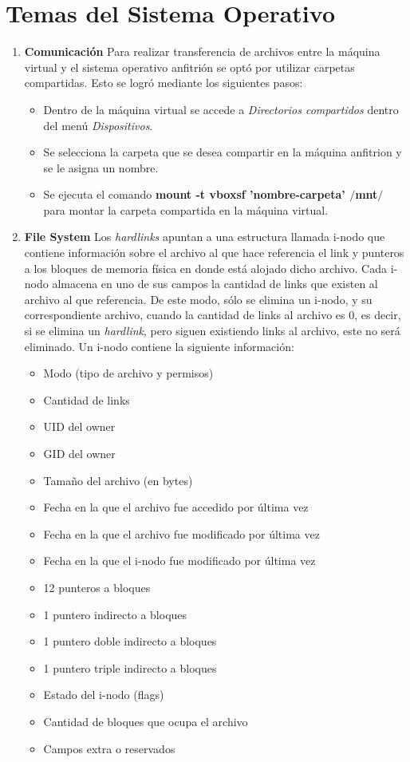 \documentclass[a4paper,11pt] {article}
\begin{document}
\section*{Temas del Sistema Operativo}

\begin{enumerate}
  \item \textbf{Comunicaci\'on}
    Para realizar transferencia de archivos entre la m\'aquina virtual y el sistema operativo anfitri\'on se opt\'o por utilizar carpetas compartidas. Esto se logr\'o mediante los siguientes pasos:
    \begin{itemize}
      \item Dentro de la m\'aquina virtual se accede a \textit{Directorios compartidos} dentro del men\'u \textit{Dispositivos}.
      \item Se selecciona la carpeta que se desea compartir en la m\'aquina anfitrion y se le asigna un nombre.
      \item Se ejecuta el comando \textbf{mount -t vboxsf 'nombre-carpeta' $/$mnt$/$} para montar la carpeta compartida en la m\'aquina virtual.
    \end{itemize}

  \item \textbf{File System}
    Los \textit{hardlinks} apuntan a una estructura llamada i-nodo que contiene información sobre el archivo al que hace referencia el link y punteros a los bloques de memoria física en donde está alojado dicho archivo. Cada i-nodo almacena en uno de sus campos la cantidad de links que existen al archivo al que referencia. De este modo, sólo se elimina un i-nodo, y su correspondiente archivo, cuando la cantidad de links al archivo es 0, es decir, si se elimina un \textit{hardlink}, pero siguen existiendo links al archivo, este no será eliminado.
    Un i-nodo contiene la siguiente información:
    \begin{itemize}
      \item Modo (tipo de archivo y permisos)
      \item Cantidad de links
      \item UID del owner
      \item GID del owner
      \item Tamaño del archivo (en bytes)
      \item Fecha en la que el archivo fue accedido por última vez
      \item Fecha en la que el archivo fue modificado por última vez
      \item Fecha en la que el i-nodo fue modificado por última vez
      \item 12 punteros a bloques
      \item 1 puntero indirecto a bloques
      \item 1 puntero doble indirecto a bloques
      \item 1 puntero triple indirecto a bloques
      \item Estado del i-nodo (flags)
      \item Cantidad de bloques que ocupa el archivo
      \item Campos extra o reservados
    \end{itemize}


\end{enumerate}
\end{document}
